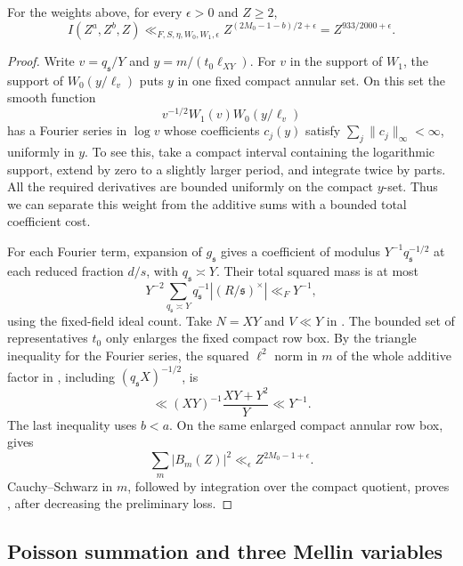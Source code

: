\begin{proposition}\label{prop:probe-low}
For the weights above, for every \(\epsilon>0\) and \(Z\ge2\),
\begin{equation}
 I(Z^a,Z^b,Z)\ll_{F,S,\eta,W_0,W_1,\epsilon}
 Z^{(2M_0-1-b)/2+\epsilon}
       =Z^{933/2000+\epsilon}.
\label{eq:probe-low}
\end{equation}
\end{proposition}

\begin{proof}
Write \(v=q_{\mathfrak s}/Y\) and
\(y=m/(t_0\ell_{XY})\).  For \(v\) in the support of \(W_1\), the support
of \(W_0(y/\ell_v)\) puts \(y\) in one fixed compact annular set.
On this set the smooth function
\[
 v^{-1/2}W_1(v)W_0(y/\ell_v)
\]
has a Fourier series in \(\log v\) whose coefficients \(c_j(y)\)
satisfy \(\sum_j\|c_j\|_\infty<\infty\), uniformly in \(y\).
To see this, take a compact interval containing the logarithmic support,
extend by zero to a slightly larger period, and integrate twice by parts.
All the required derivatives are bounded uniformly on the compact
\(y\)-set.  Thus we can separate this weight from the additive sums with
a bounded total coefficient cost.

For each Fourier term, expansion of \(g_{\mathfrak s}\) gives a
coefficient of modulus \(Y^{-1}q_{\mathfrak s}^{-1/2}\) at each reduced
fraction \(d/s\), with \(q_{\mathfrak s}\asymp Y\).  Their total squared
mass is at most
\[
 Y^{-2}\sum_{q_{\mathfrak s}\asymp Y}
                 q_{\mathfrak s}^{-1}|(R/\mathfrak s)^\times|
 \ll_F Y^{-1},
\]
using the fixed-field ideal count.  Take \(N=XY\) and \(V\ll Y\) in
.  The bounded set of representatives \(t_0\)
only enlarges the fixed compact row box.  By the triangle inequality for
the Fourier series, the squared \(\ell^2\) norm in \(m\) of the whole
additive factor in , including
\((q_{\mathfrak s}X)^{-1/2}\), is
\[
 \ll (XY)^{-1}\frac{XY+Y^2}{Y}\ll Y^{-1}.
\]
The last inequality uses \(b<a\).  On the same enlarged compact annular
row box,  gives
\[
 \sum_m |B_m(Z)|^2\ll_\epsilon Z^{2M_0-1+\epsilon}.
\]
Cauchy--Schwarz in \(m\), followed by integration over the compact
quotient, proves , after decreasing the preliminary
loss.
\end{proof}

\subsection{Poisson summation and three Mellin variables}

